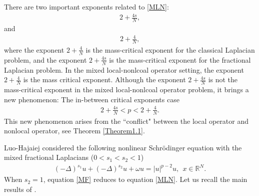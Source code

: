 \documentclass[12pt,a4paper,reqno]{amsart}
\numberwithin{equation}{section}
\begin{document}
There are two important exponents related to  \eqref{MLN}:
\begin{equation*}
\begin{aligned}
2+\frac{4s}{N},
\end{aligned}
\end{equation*}
and
\begin{equation*}
\begin{aligned}
2+\frac{4}{N},
\end{aligned}
\end{equation*}
where the exponent $2+\frac{4}{N}$ is the mass-critical exponent for the classical Laplacian problem,
and the exponent $2+\frac{4s}{N}$ is the mass-critical exponent for the fractional Laplacian problem.
In the mixed local-nonlcoal operator setting,
the exponent $2+\frac{4}{N}$ is the mass critical exponent.
Although the exponent $2+\frac{4s}{N}$ is not the mass-critical exponent in the mixed local-nonlcoal operator problem, it brings a new phenomenon:
The in-between critical exponents case
\begin{equation*}
\begin{aligned}
2+\frac{4s}{N}<p<2+\frac{4}{N}.
\end{aligned}
\end{equation*}
This new phenomenon arises from the ``conflict" between the local operator and nonlocal operator, see Theorem \ref{Theorem1.1}.


Luo-Hajaiej \cite{LuoTJ-Hajaiej2022ANS} considered the following nonlinear Schr\"odinger equation with the mixed fractional Laplacians ($0<s_{1}<s_{2}<1$)
\begin{equation}\label{MF}
\begin{aligned}
(-\Delta)^{s_{1}} u
+(-\Delta)^{s_{2}}u+\omega u=|u|^{p-2}u, \ \ x\in \mathbb{R}^{N}.
\end{aligned}
\tag{MF}
\end{equation}
When $s_{2}=1$,
 equation \eqref{MF} reduces to equation \eqref{MLN}.
Let us recall the main results  of \cite{LuoTJ-Hajaiej2022ANS}.
\end{document}
